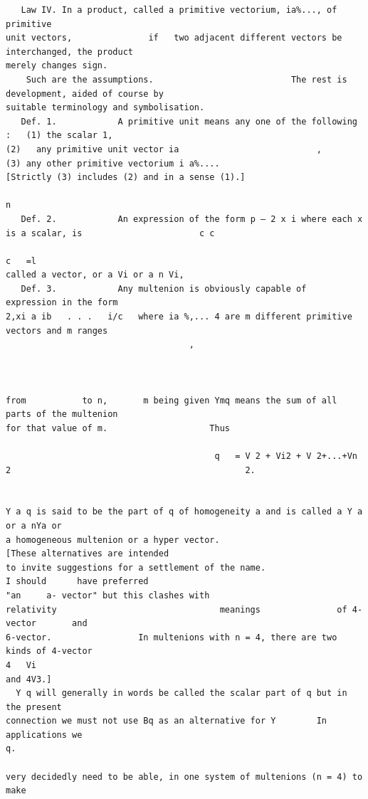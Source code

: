 \documentclass[10pt]{article}
\begin{document}
\begin{verbatim}
   Law IV. In a product, called a primitive vectorium, ia%..., of primitive
unit vectors,               if   two adjacent different vectors be interchanged, the product
merely changes sign.
    Such are the assumptions.                           The rest is development, aided of course by
suitable terminology and symbolisation.
   Def. 1.            A primitive unit means any one of the following                                                                        :   (1) the scalar 1,
(2)   any primitive unit vector ia                           ,       (3) any other primitive vectorium i a%....
[Strictly (3) includes (2) and in a sense (1).]
                                                                                                n
   Def. 2.            An expression of the form p — 2 x i where each x is a scalar, is                       c c
                                                                                            c   =l
called a vector, or a Vi or a n Vi,
   Def. 3.            Any multenion is obviously capable of                                                                        expression in the form
2,xi a ib   . . .   i/c   where ia %,... 4 are m different primitive vectors and m ranges
                                    ,



from           to n,       m being given Ymq means the sum of all parts of the multenion
for that value of m.                    Thus

                                         q   = V 2 + Vi2 + V 2+...+Vn               2                                              2.


Y a q is said to be the part of q of homogeneity a and is called a Y a or a nYa or
a homogeneous multenion or a hyper vector.                                                                [These alternatives are intended
to invite suggestions for a settlement of the name.                                                                                 I should      have preferred
"an     a- vector" but this clashes with                                        relativity                                meanings               of 4-vector       and
6-vector.                 In multenions with n = 4, there are two kinds of 4-vector                                                                                4   Vi
and 4V3.]
  Y q will generally in words be called the scalar part of q but in the present
connection we must not use Bq as an alternative for Y        In applications we                                                         q.

very decidedly need to be able, in one system of multenions (n = 4) to make


\end{verbatim}
\end{document}
